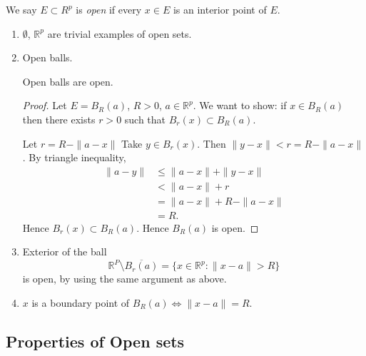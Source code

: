 \begin{definition}
	We say $E \subset R^p$ is \textit{open} if every $x \in E$ is an interior point of $E$.
\end{definition}
\begin{example}
	\begin{enumerate}
		\item $\emptyset $, $\mathbb{R}^p$ are trivial examples of open sets.
		\item Open balls.
\begin{proposition}
	Open balls are open.
\end{proposition}
\begin{proof}
	Let $E = B_R(a)$, $R>0$, $a \in \mathbb{R}^p$. We want to show: if $x \in B_R(a)$ then there exists $r>0$ such that $B_r(x) \subset B_R(a)$.

	Let $r = R - \|a-x\|$
	Take $y \in B_r(x)$. Then $\|y-x\|<r = R - \|a-x\|$. By triangle inequality,
	\begin{align*}
		\|a-y\|&\le \|a-x\| + \|y-x\|\\
		&< \|a-x\| + r \\
		&= \|a-x\| + R - \|a-x\| \\
		&= R
	.\end{align*} 
	Hence $B_r(x) \subset B_R(a)$. Hence $B_R(a)$ is open.
\end{proof}
\item Exterior of the ball
	\[
		\mathbb{R}^P \setminus \overline{B_r(a)}  = \{x \in \mathbb{R}^p: \|x-a\|>R\}
	\]
	is open, by using the same argument as above.

\item $x$ is a boundary point of $B_R(a) \iff \|x-a\|=R$.
	\end{enumerate}
\end{example}

\subsection{Properties of Open sets}

